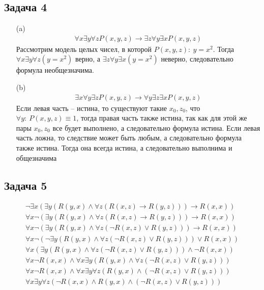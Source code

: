 \subsection*{Задача 4}
\begin{enumerate}
\item[(a)]
	\begin{gather*}
		\forall x \exists y \forall z P(x,y,z) \to \exists z \forall y \exists x P(x,y,z)
	\end{gather*}
	Рассмотрим модель целых чисел, в которой $P(x,y,z):\ y = x^2$. Тогда $\forall x \exists y \forall z (y = x^2)$ верно, а $\exists z \forall y \exists x (y = x^2)$ неверно, следовательно формула необщезначима.
\item[(b)]
	\begin{gather*}
		\exists x \forall y \exists z P(x,y,z) \to \forall y \exists z \exists x P(x,y,z)
	\end{gather*}
	Если левая часть -- истина, то существуют такие $x_0, z_0$, что $\forall y:\ P(x,y,z) \equiv 1$, тогда правая часть также истина, так как для этой же пары $x_0, z_0$ все будет выполнено, а следовательно формула истина. Если левая часть ложна, то следствие может быть любым, а следовательно формула также истина. Тогда она всегда истина, а следовательно выполнима и общезначима
\end{enumerate}
\vskip 0.4in

\subsection*{Задача 5}
	\begin{gather*}
		\neg \exists x(\exists y(R(y,x) \wedge \forall z(R(x,z) \to R(y,z))) \to R(x,x))\\
		\forall x \neg (\exists y(R(y,x) \wedge \forall z(R(x,z) \to R(y,z))) \to R(x,x))\\
		\forall x \neg (\exists y(R(y,x) \wedge \forall z(\neg R(x,z) \vee R(y,z))) \to R(x,x))\\
		\forall x \neg ( \neg \exists y(R(y,x) \wedge \forall z(\neg R(x,z) \vee R(y,z))) \vee R(x,x))\\
		\forall x (\exists y(R(y,x) \wedge \forall z(\neg R(x,z) \vee R(y,z))) \wedge \neg R(x,x))\\
		\forall x \neg R(x,x) \wedge \forall x \exists y (R(y,x) \wedge \forall z (\neg R(x,z) \vee R(y,z)))\\
		\forall x \neg R(x,x) \wedge \forall x \exists y \forall z (R(y,x) \wedge (\neg R(x,z) \vee R(y,z)))\\
		\forall x \exists y \forall z (\neg R(x,x) \wedge R(y,x) \wedge (\neg R(x,z) \vee R(y,z)))
	\end{gather*}

